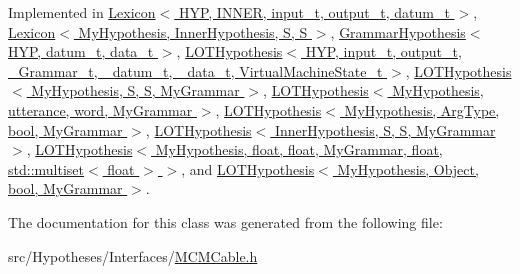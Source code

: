 Implemented in \hyperlink{class_lexicon_ac8577ba9b4554ebf1852020c617bd7df}{Lexicon$<$ H\+Y\+P, I\+N\+N\+E\+R, input\+\_\+t, output\+\_\+t, datum\+\_\+t $>$}, \hyperlink{class_lexicon_ac8577ba9b4554ebf1852020c617bd7df}{Lexicon$<$ My\+Hypothesis, Inner\+Hypothesis, S, S $>$}, \hyperlink{class_grammar_hypothesis_aa0d96def3fe7e22a2bbf2c89ba996bcf}{Grammar\+Hypothesis$<$ H\+Y\+P, datum\+\_\+t, data\+\_\+t $>$}, \hyperlink{class_l_o_t_hypothesis_a0791b7ba0105870a2094877445570b61}{L\+O\+T\+Hypothesis$<$ H\+Y\+P, input\+\_\+t, output\+\_\+t, \+\_\+\+Grammar\+\_\+t, \+\_\+datum\+\_\+t, \+\_\+data\+\_\+t, Virtual\+Machine\+State\+\_\+t $>$}, \hyperlink{class_l_o_t_hypothesis_a0791b7ba0105870a2094877445570b61}{L\+O\+T\+Hypothesis$<$ My\+Hypothesis, S, S, My\+Grammar $>$}, \hyperlink{class_l_o_t_hypothesis_a0791b7ba0105870a2094877445570b61}{L\+O\+T\+Hypothesis$<$ My\+Hypothesis, utterance, word, My\+Grammar $>$}, \hyperlink{class_l_o_t_hypothesis_a0791b7ba0105870a2094877445570b61}{L\+O\+T\+Hypothesis$<$ My\+Hypothesis, Arg\+Type, bool, My\+Grammar $>$}, \hyperlink{class_l_o_t_hypothesis_a0791b7ba0105870a2094877445570b61}{L\+O\+T\+Hypothesis$<$ Inner\+Hypothesis, S, S, My\+Grammar $>$}, \hyperlink{class_l_o_t_hypothesis_a0791b7ba0105870a2094877445570b61}{L\+O\+T\+Hypothesis$<$ My\+Hypothesis, float, float, My\+Grammar, float, std\+::multiset$<$ float $>$ $>$}, and \hyperlink{class_l_o_t_hypothesis_a0791b7ba0105870a2094877445570b61}{L\+O\+T\+Hypothesis$<$ My\+Hypothesis, Object, bool, My\+Grammar $>$}.



The documentation for this class was generated from the following file\+:\begin{DoxyCompactItemize}
\item 
src/\+Hypotheses/\+Interfaces/\hyperlink{_m_c_m_cable_8h}{M\+C\+M\+Cable.\+h}\end{DoxyCompactItemize}
